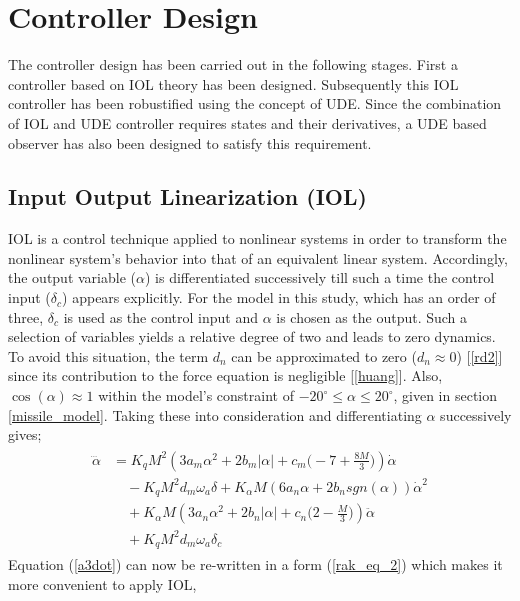 \documentclass[conference]{IEEEtran}
\begin{document}
\section{Controller Design} \label{controller_design}

	The controller design has been carried out in the following stages. First a controller based on IOL theory has been designed. Subsequently this IOL controller has been robustified using the concept of UDE. Since the combination of IOL and UDE controller requires states and their derivatives, a UDE based observer has also been designed to satisfy this requirement.
	
	\subsection{Input Output Linearization (IOL)}\label{AA}
		IOL is a control technique applied to nonlinear systems in order to transform the nonlinear system's behavior into that of an equivalent linear system.  Accordingly, the output variable ($\alpha$) is differentiated successively till such a time the control input ($\delta_c$) appears explicitly. For the model in this study, which has an order of three, $\delta_c$ is used as the control input and $\alpha$ is chosen as the output. Such a selection of variables yields a relative degree of two and leads to zero dynamics. To avoid this situation, the term $d_n$ can be approximated to zero ($d_n \approx 0$) [\ref{rd2}] since its contribution to the force equation is negligible [\ref{huang}]. Also, $\cos(\alpha) \approx 1$ within the model's constraint of $-20^\circ \leq \alpha \leq 20^\circ$, given in section \ref{missile_model}. Taking these into consideration and differentiating $\alpha$ successively gives;
		\begin{eqnarray}
			\begin{aligned}
				\dddot{\alpha}&=K_q M^2(3a_m\alpha^2+2b_m|\alpha|+c_m\Big(-7+\frac{8M}{3}\Big))\dot{\alpha}\\ 
				&\quad - K_q M^2d_m\omega_a\delta+K_{\alpha}M(6a_n\alpha+2b_n sgn(\alpha))\dot{\alpha}^2\\ 
				&\quad + K_\alpha M(3a_n\alpha^2+2b_n|\alpha|+c_n\Big(2-\frac{M}{3}\Big))\ddot{\alpha}\\ 
				&\quad + K_q M^2d_m\omega_a\delta_c \label{a3dot}
			\end{aligned}
		\end{eqnarray}
		Equation (\ref{a3dot}) can now be re-written in a form (\ref{rak_eq_2}) which makes it more convenient to apply IOL,
\end{document}
